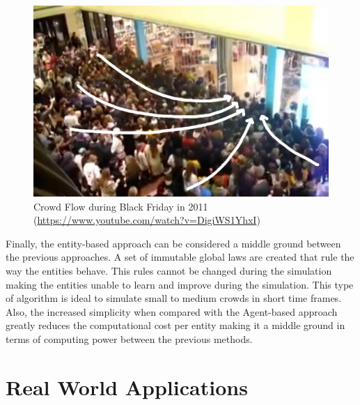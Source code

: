 \documentclass[sigconf]{acmart}
\begin{document}
\begin{figure}[h]
  \centering
  \includegraphics[width=0.95\linewidth]{images/crowd_flow.png}
  \caption{Crowd Flow during Black Friday in 2011 (\url{https://www.youtube.com/watch?v=DigiWS1YhxI})}
  \label{fig:crowdFlow}
\end{figure}

Finally, the entity-based approach can be considered a middle ground between the previous
approaches. A set of immutable global laws are created that rule the way the entities behave.
This rules cannot be changed during the simulation making the entities unable to learn
and improve during the simulation. This type of algorithm is ideal to simulate small to
medium crowds in short time frames. Also, the increased simplicity when compared with the
Agent-based approach greatly reduces the computational cost per entity making it
a middle ground in terms of computing power between the previous methods.


\section{Real World Applications}
\end{document}

